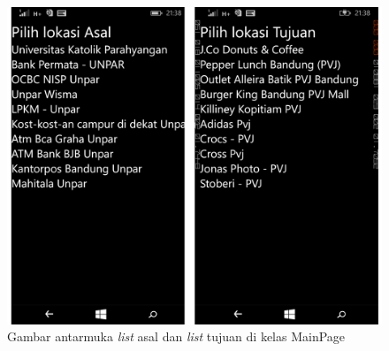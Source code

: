 	\begin{figure}[!h]
		\centering
			\includegraphics[scale=0.2]{Gambar/antarmuka/list_main}
		\caption{Gambar antarmuka \textit{list} asal dan \textit{list} tujuan di kelas MainPage}
		\label{fig:antarmuka list MainPage}
	\end{figure}
	

